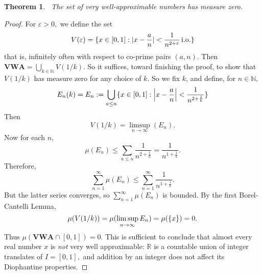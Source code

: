 \documentclass[12pt, letterpaper, oneside]{book}
\renewcommand{\ge}{\ensuremath{\varepsilon}}
\newcommand{\R}{\mathbb{R}}
\newcommand{\N}{\mathbb{N}}
\DeclarePairedDelimiter{\abs}{\lvert}{\rvert}
\DeclarePairedDelimiter{\set}{\lbrace}{\rbrace}
\theoremstyle{plain}
\newtheorem{theorem}{Theorem}
\theoremstyle{definition}
\theoremstyle{remark}
\begin{document}
\begin{theorem}~\label{thm: measure_vwa}
The set of very well-approximable numbers has measure zero. 
\end{theorem}
\begin{proof}
For $\ge > 0,$ we define the set
\[
V(\ge) = \set{x \in [0,1] : \abs{x - \frac{a}{n}} < \frac{1}{n^{2 + \ge}}\,\mbox{i.o.}}
\]
that is, infinitely often with respect to co-prime pairs $(a,n)$. Then $\mathbf{VWA} = {\bigcup_{k \in \N} V(1/k)}.$ So it suffices, toward finishing the proof, to show that $V(1/k)$ has measure zero for any choice of $k$. So we fix $k$, and define, for $n\in \N,$
\[
E_n(k) = E_n := \bigcup_{a \leq n} \set{x \in [0,1] : \abs*{x - \frac{a}{n}} < \frac{1}{n^{2 + \frac{1}{k}}}}
\]
Then 
\[
V(1/k) = \limsup \limits_{n \to \infty}(E_n).
\]
Now for each $n$, 
\[
\mu(E_n) \leq \sum_{a \leq n} \frac{1}{n^{2 + \frac{1}{k}}} = \frac{1}{n^{1+\frac{1}{k}}}.
\]
Therefore,
\[
\sum_{n=1}^{\infty} \mu(E_n) \leq \sum_{n=1}^{\infty} \frac{1}{n^{1+\frac{1}{k}}}.
\]
But the latter series converges, so $\sum_{n=1}^{\infty} \mu(E_n)$ is bounded. By the first Borel-Cantelli Lemma, 
\[
\mu(V(1/k)) = \mu(\limsup\limits_{n\to \infty} E_n) = \mu(\set{x}) = 0. 
\]
Thus $\mu(\mathbf{VWA}\cap[0,1]) = 0.$ This is sufficient to conclude that almost every real number $x$ is \textit{not} very well approximable: $\R$ is a countable union of integer translates of $I = [0,1],$ and addition by an integer does not affect its Diophantine properties.
\end{proof}
 
\end{document}
